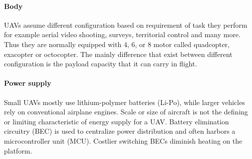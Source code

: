 \paragraph{Body} UAVs assume different configuration based on requirement of
task they perform for example aerial video shooting, surveys, territorial
control and many more.
Thus they are normally equipped with 4, 6, or 8 motor called quadcopter,
exacopter or octocopter.
The mainly difference that exist between different configuration is the payload
capacity that it can carry in flight.

\paragraph{Power supply}
Small UAVs mostly use lithium-polymer batteries (Li-Po), while larger vehicles
rely on conventional airplane engines. Scale or size of aircraft is not the
defining or limiting characteristic of energy supply for a UAV. 
Battery elimination circuitry (BEC) is used to centralize power distribution and
often harbors a microcontroller unit (MCU). Costlier switching BECs diminish
heating on the platform.\cite{wiki:uav}







